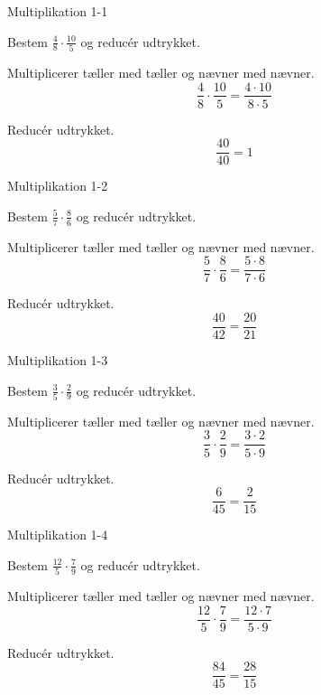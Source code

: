 \documentclass{article}
\begin{document}

\tableofcontents
\newpage

\begin{exercise}{Multiplikation 1-1}

Bestem $\frac{4}{8} \cdot \frac{10}{5}$ og reducér udtrykket.


\hint

Multiplicerer tæller med tæller og nævner med nævner.
\[
\frac{4}{8} \cdot \frac{10}{5} = \frac{4 \cdot 10}{8 \cdot 5} 
\]

\hint

Reducér udtrykket.
\[
\frac{40}{40} = 1
\]


\end{exercise}

\newpage

\begin{exercise}{Multiplikation 1-2}
	
	Bestem $\frac{5}{7} \cdot \frac{8}{6}$ og reducér udtrykket.
	
	
	\hint
	
	Multiplicerer tæller med tæller og nævner med nævner.
	\[
	\frac{5}{7} \cdot \frac{8}{6} = \frac{5 \cdot  8}{7 \cdot 6}
	\]
	
	\hint
	
	Reducér udtrykket.
	\[
	\frac{40}{42} = \frac{20}{21}
	\]
	
	
\end{exercise}

\newpage

\begin{exercise}{Multiplikation 1-3}
	
	Bestem $\frac{3}{5} \cdot \frac{2}{9}$ og reducér udtrykket.
	
	
	\hint
	
	Multiplicerer tæller med tæller og nævner med nævner.
	\[
	\frac{3}{5} \cdot \frac{2}{9}= \frac{3 \cdot 2}{5 \cdot 9} 
	\]
	
	\hint
	
	Reducér udtrykket.
	\[
	\frac{6}{45} = \frac{2}{15}
	\]
	
	
\end{exercise}

\newpage

\begin{exercise}{Multiplikation 1-4}
	
	Bestem $\frac{12}{5} \cdot \frac{7}{9}$ og reducér udtrykket.
	
	
	\hint
	
	Multiplicerer tæller med tæller og nævner med nævner.
	\[
	\frac{12}{5} \cdot \frac{7}{9} = \frac{12 \cdot 7}{5 \cdot 9} 
	\]
	
	\hint
	
	Reducér udtrykket.
	\[
	\frac{84}{45} = \frac{28}{15}
	\]
	
	
\end{exercise}
\end{document}
